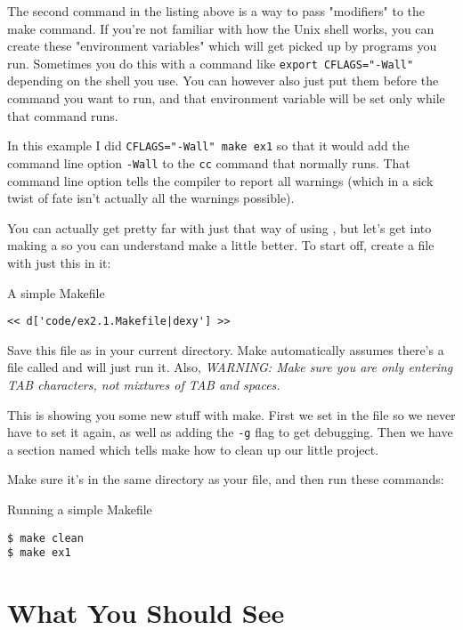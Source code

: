 The second command in the listing above is a way to pass "modifiers" to the
make command.  If you're not familiar with how the Unix shell works, you can
create these "environment variables" which will get picked up by programs you
run.  Sometimes you do this with a command like \verb|export CFLAGS="-Wall"|
depending on the shell you use.  You can however also just put them before the
command you want to run, and that environment variable will be set only while
that command runs.

In this example I did \verb|CFLAGS="-Wall" make ex1| so that it would
add the command line option \verb|-Wall| to the \verb|cc| command that
 normally runs.  That command line option tells the compiler
 to report all warnings (which in a sick twist of fate isn't
actually all the warnings possible).

You can actually get pretty far with just that way of using ,
but let's get into making a  so you can understand
make a little better.  To start off, create a file with just this
in it:

\begin{code}{A simple Makefile}
\begin{lstlisting}
<< d['code/ex2.1.Makefile|dexy'] >>
\end{lstlisting}
\end{code}

Save this file as  in your current directory.  Make
automatically assumes there's a file called  and will
just run it.  Also, \emph{WARNING: Make sure you are only entering TAB
characters, not mixtures of TAB and spaces.}

This  is showing you some new stuff with make.  First we set
 in the file so we never have to set it again, as well
as adding the \verb|-g| flag to get debugging.  Then we have a 
section named  which tells make how to clean up our
little project.

Make sure it's in the same directory as your  file, and then
run these commands:

\begin{Terminal}{Running a simple Makefile}
\begin{lstlisting}
$ make clean
$ make ex1
\end{lstlisting}
\end{Terminal}

\section{What You Should See}

